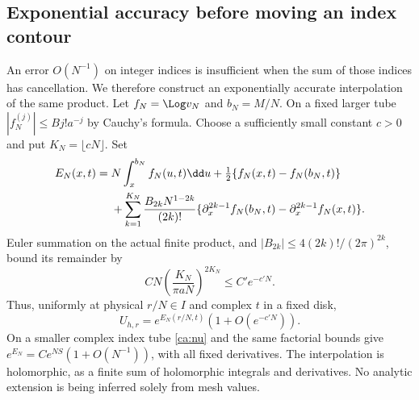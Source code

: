 \subsection{Exponential accuracy before moving an index contour}

An error $O(N^{-1})$ on integer indices is insufficient when the sum of those indices has cancellation. We therefore construct an exponentially accurate interpolation of the same product. Let
$f_N=\Log v_N$ and $b_N=M/N$. On a fixed larger tube
$|f_N^{(j)}|\le B j! a^{-j}$ by Cauchy's formula. Choose a sufficiently small constant $c>0$ and put $K_N=\lfloor cN\rfloor$. Set
\begin{align}
 E_N(x,t)={}&N\int_x^{b_N}f_N(u,t)\dd u
       +\tfrac12\{f_N(x,t)-f_N(b_N,t)\}\notag\\
 &+\sum_{k=1}^{K_N}\frac{B_{2k}N^{1-2k}}{(2k)!}
 \{\partial_x^{2k-1}f_N(b_N,t)
             -\partial_x^{2k-1}f_N(x,t)\}.\label{ca:EM}
\end{align}
Euler summation on the actual finite product, and
$|B_{2k}|\le4(2k)!/(2\pi)^{2k}$, bound its remainder by
\[
 CN\left(\frac{K_N}{\pi aN}\right)^{2K_N}\le C'e^{-c'N}.
\]
Thus, uniformly at physical $r/N\in I$ and complex $t$ in a fixed disk,
\begin{equation}\label{ca:exponential-interpolation}
 U_{h,r}=e^{E_N(r/N,t)}(1+O(e^{-c'N})).
\end{equation}
On a smaller complex index tube \eqref{ca:nu} and the same factorial bounds give
$e^{E_N}=C e^{NS}(1+O(N^{-1}))$, with all fixed derivatives. The interpolation is holomorphic, as a finite sum of holomorphic integrals and derivatives. No analytic extension is being inferred solely from mesh values.

